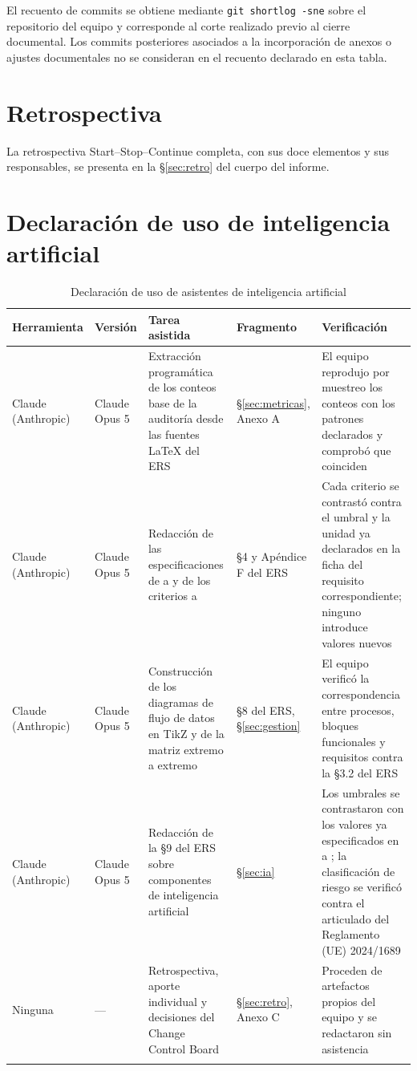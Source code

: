\noindent
El recuento de commits se obtiene mediante \verb|git shortlog -sne| sobre el repositorio del equipo y corresponde al corte realizado previo al cierre documental. Los commits posteriores asociados a la incorporación de anexos o ajustes documentales no se consideran en el recuento declarado en esta tabla.

\section{Retrospectiva}

La retrospectiva Start--Stop--Continue completa, con sus doce elementos y sus responsables, se
presenta en la \S\ref{sec:retro} del cuerpo del informe.

\section{Declaración de uso de inteligencia artificial}

\begin{longtable}{|L{2.4cm}|L{2.2cm}|L{4.4cm}|L{2.4cm}|L{3.2cm}|}
\hline
{}\textbf{Herramienta} & \textbf{Versión} & \textbf{Tarea asistida} & \textbf{Fragmento} & \textbf{Verificación}\\ \hline
\endhead
Claude (Anthropic) & Claude Opus 5 & Extracción programática de los conteos base de la auditoría desde las fuentes \LaTeX{} del ERS & \S\ref{sec:metricas}, Anexo A & El equipo reprodujo por muestreo los conteos con los patrones declarados y comprobó que coinciden\\ \hline
Claude (Anthropic) & Claude Opus 5 & Redacción de las especificaciones de  a  y de los criterios  a  & \S4 y Apéndice F del ERS & Cada criterio se contrastó contra el umbral y la unidad ya declarados en la ficha del requisito correspondiente; ninguno introduce valores nuevos\\ \hline
Claude (Anthropic) & Claude Opus 5 & Construcción de los diagramas de flujo de datos en TikZ y de la matriz extremo a extremo & \S8 del ERS, \S\ref{sec:gestion} & El equipo verificó la correspondencia entre procesos, bloques funcionales y requisitos contra la \S3.2 del ERS\\ \hline
Claude (Anthropic) & Claude Opus 5 & Redacción de la \S9 del ERS sobre componentes de inteligencia artificial & \S\ref{sec:ia} & Los umbrales se contrastaron con los valores ya especificados en  a ; la clasificación de riesgo se verificó contra el articulado del Reglamento (UE) 2024/1689\\ \hline
Ninguna & --- & Retrospectiva, aporte individual y decisiones del Change Control Board & \S\ref{sec:retro}, Anexo C & Proceden de artefactos propios del equipo y se redactaron sin asistencia\\ \hline
\caption{Declaración de uso de asistentes de inteligencia artificial}
\label{tab:decl-ia}
\end{longtable}

